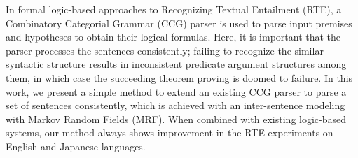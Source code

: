 In formal logic-based approaches to Recognizing Textual Entailment (RTE), a Combinatory Categorial Grammar (CCG) parser is used to parse input premises and hypotheses to obtain their logical formulas. Here, it is important that the parser processes the sentences consistently; failing to recognize the similar syntactic structure results in inconsistent predicate argument structures among them, in which case the succeeding theorem proving is doomed to failure. In this work, we present a simple method to extend an existing CCG parser to parse a set of sentences consistently, which is achieved with an inter-sentence modeling with Markov Random Fields (MRF). When combined with existing logic-based systems, our method always shows improvement in the RTE experiments on English and Japanese languages.
